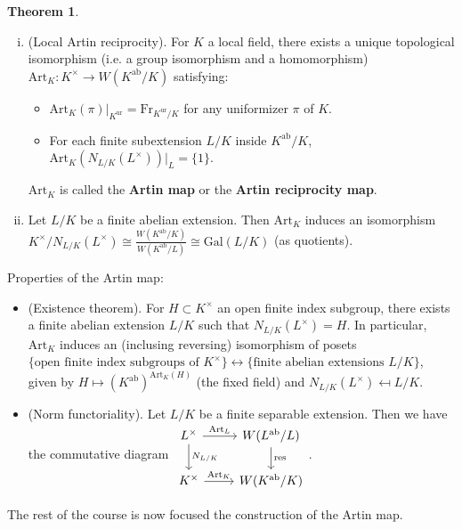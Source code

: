 \documentclass{article}
\theoremstyle{definition}
\newtheorem{theorem}{Theorem}[section]
\begin{document}
\begin{theorem}\label{theorem17.3}
    \begin{enumerate}[(i)]
        \item (Local Artin reciprocity). For $K$ a local field, there exists a unique topological isomorphism (i.e. a group isomorphism and a homomorphism) $\text{Art}_K : K^\times \to W(K^{\text{ab}}/K)$ satisfying:
        \begin{itemize}
            \item $\text{Art}_K(\pi)|_{K^{\text{ur}}} = \text{Fr}_{K^{\text{ur}}/K}$ for any uniformizer $\pi$ of $K$.
            \item For each finite subextension $L/K$ inside $K^{\text{ab}}/K$, $\text{Art}_{K}(N_{L/K}(L^\times))|_{L} = \{1\}$. 
        \end{itemize}
        $\text{Art}_K$ is called the \textbf{Artin map} or the \textbf{Artin reciprocity map}.
        \item Let $L/K$ be a finite abelian extension. Then $\text{Art}_K$ induces an isomorphism $K^\times/N_{L/K}(L^{\times}) \cong \frac{W(K^{\text{ab}}/K)}{W(K^{\text{ab}}/L)} \cong \text{Gal}(L/K)$ (as quotients).
    \end{enumerate}
\end{theorem}
Properties of the Artin map:
\begin{itemize}
    \item (Existence theorem). For $H \subset K^\times$ an open finite index subgroup, there exists a finite abelian extension $L/K$ such that $N_{L/K}(L^\times) = H$. In particular, $\text{Art}_K$ induces an (inclusing reversing) isomorphism of posets $\{\text{open finite index subgroups of }K^\times\} \leftrightarrow \{\text{finite abelian extensions }L/K\}$, given by $H \mapsto (K^{\text{ab}})^{\text{Art}_K(H)}$ (the fixed field) and $N_{L/K}(L^\times) \mapsfrom L/K$.
    \item (Norm functoriality). Let $L/K$ be a finite separable extension. Then we have the commutative diagram 
    $\begin{tikzcd}
        L^\times & W(L^{\text{ab}}/L)\\
        K^\times & W(K^{\text{ab}}/K)
        \arrow["N_{L/K}", from=1-1, to=2-1]
        \arrow["\text{Art}_L", from=1-1, to=1-2]
        \arrow["\text{Art}_K", from=2-1, to=2-2]
        \arrow["\text{res}", from=1-2, to=2-2]
    \end{tikzcd}$.
\end{itemize}
The rest of the course is now focused the construction of the Artin map.
\end{document}
